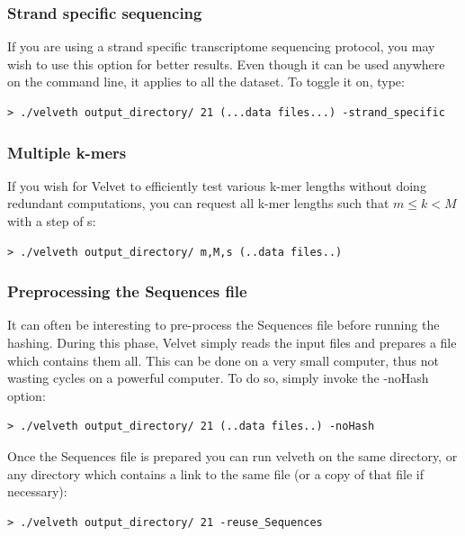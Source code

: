 \documentclass{article}
\begin{document}
\subsubsection{Strand specific sequencing}

If you are using a strand specific transcriptome sequencing protocol, you may wish to use this option for better results. Even though it can be used anywhere on the command line, it applies to all the dataset. To toggle it on, type:

\begin{verbatim}
> ./velveth output_directory/ 21 (...data files...) -strand_specific
\end{verbatim}

\subsubsection{Multiple k-mers}

If you wish for Velvet to efficiently test various k-mer lengths without doing redundant computations, you can request all k-mer lengths such that $m \le k < M$ with a step of s:

\begin{verbatim}
> ./velveth output_directory/ m,M,s (..data files..)
\end{verbatim}

\subsubsection{Preprocessing the Sequences file}

It can often be interesting to pre-process the Sequences file before running the hashing. During this phase, Velvet simply reads the input files and prepares a file which contains them all. This can be done on a very small computer, thus not wasting cycles on a powerful computer. To do so, simply invoke the -noHash option:

\begin{verbatim}
> ./velveth output_directory/ 21 (..data files..) -noHash
\end{verbatim}

Once the Sequences file is prepared you can run velveth on the same directory, or any directory which contains a link to the same file (or a copy of that file if necessary):

\begin{verbatim}
> ./velveth output_directory/ 21 -reuse_Sequences
\end{verbatim}
\end{document}
